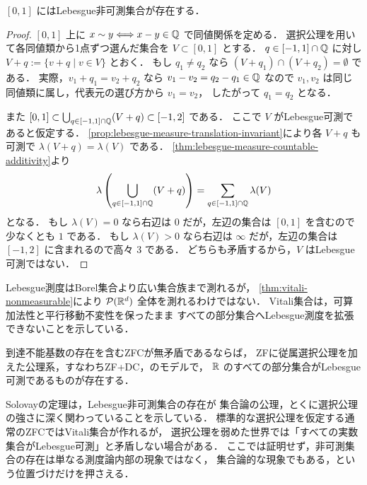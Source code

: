 \begin{theorem}[Vitali]\label{thm:vitali-nonmeasurable}
$[0,1]$ にはLebesgue非可測集合が存在する．
\end{theorem}
\begin{proof}
$[0,1]$ 上に $x\sim y \Longleftrightarrow x-y\in\mathbb Q$ で同値関係を定める．
選択公理を用いて各同値類から1点ずつ選んだ集合を $V\subset[0,1]$ とする．
$q\in[-1,1]\cap\mathbb Q$ に対し $V+q:=\{v+q\mid v\in V\}$ とおく．
もし $q_1\ne q_2$ なら $(V+q_1)\cap(V+q_2)=\emptyset$ である．
実際，$v_1+q_1=v_2+q_2$ なら $v_1-v_2=q_2-q_1\in\mathbb Q$ なので
$v_1,v_2$ は同じ同値類に属し，代表元の選び方から $v_1=v_2$，
したがって $q_1=q_2$ となる．

また $[0,1]\subset\bigcup_{q\in[-1,1]\cap\mathbb Q}(V+q)\subset[-1,2]$ である．
ここで $V$ がLebesgue可測であると仮定する．
\cref{prop:lebesgue-measure-translation-invariant}により各 $V+q$ も可測で
$\lambda(V+q)=\lambda(V)$ である．
\cref{thm:lebesgue-measure-countable-additivity}より
\[
\lambda\left(\bigcup_{q\in[-1,1]\cap\mathbb Q}(V+q)\right)
=
\sum_{q\in[-1,1]\cap\mathbb Q}\lambda(V)
\]
となる．
もし $\lambda(V)=0$ なら右辺は $0$ だが，左辺の集合は $[0,1]$ を含むので少なくとも $1$ である．
もし $\lambda(V)>0$ なら右辺は $\infty$ だが，左辺の集合は $[-1,2]$ に含まれるので高々 $3$ である．
どちらも矛盾するから，$V$ はLebesgue可測ではない．
\end{proof}

\begin{remark}
Lebesgue測度はBorel集合より広い集合族まで測れるが，
\cref{thm:vitali-nonmeasurable}により $\mathcal P(\mathbb R^d)$ 全体を測れるわけではない．
Vitali集合は，可算加法性と平行移動不変性を保ったまま
すべての部分集合へLebesgue測度を拡張できないことを示している．
\end{remark}

\begin{theorem}[Solovay]\label{thm:solovay-model}
到達不能基数の存在を含むZFCが無矛盾であるならば，
ZFに従属選択公理を加えた公理系，すなわちZF+DC，のモデルで，
$\mathbb R$ のすべての部分集合がLebesgue可測であるものが存在する．
\end{theorem}

\begin{remark}
Solovayの定理は，Lebesgue非可測集合の存在が
集合論の公理，とくに選択公理の強さに深く関わっていることを示している．
標準的な選択公理を仮定する通常のZFCではVitali集合が作れるが，
選択公理を弱めた世界では「すべての実数集合がLebesgue可測」と矛盾しない場合がある．
ここでは証明せず，非可測集合の存在は単なる測度論内部の現象ではなく，
集合論的な現象でもある，という位置づけだけを押さえる．
\end{remark}

